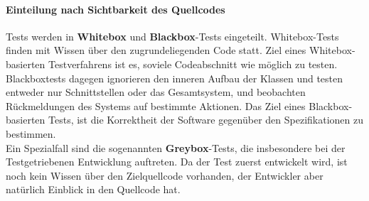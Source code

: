 \paragraph{Einteilung nach Sichtbarkeit des Quellcodes} Tests werden in \textbf{Whitebox} und \textbf{Blackbox}-Tests eingeteilt. 
Whitebox-Tests finden mit Wissen über den zugrundeliegenden Code statt. Ziel eines Whitebox-basierten Testverfahrens ist es, soviele Codeabschnitt wie möglich zu testen.\\
Blackboxtests dagegen ignorieren den inneren Aufbau der Klassen und testen entweder nur Schnittstellen oder das Gesamtsystem, und beobachten Rückmeldungen des Systems auf bestimmte Aktionen. Das Ziel eines Blackbox-basierten Tests, ist die Korrektheit der Software gegenüber den Spezifikationen zu bestimmen.\\
Ein Spezialfall sind die sogenannten \textbf{Greybox}-Tests, die insbesondere bei der Testgetriebenen Entwicklung auftreten. Da der Test zuerst entwickelt wird, ist noch kein Wissen über den Zielquellcode vorhanden, der Entwickler aber natürlich Einblick in den Quellcode hat.

